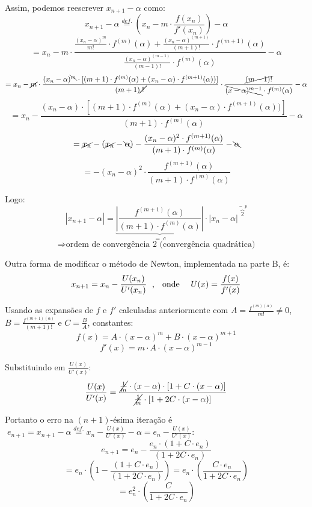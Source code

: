 \documentclass[12pt,a4paper,final]{article}
\begin{document}
Assim, podemos reescrever $ x_{n+1} - \alpha $ como:
\[ x_{n+1} - \alpha \overset{def.}{=} (x_n - m \cdot \frac{f(x_n)}{f'(x_n)}) - \alpha\]
\[ = x_n - m \cdot 
     \frac{\frac{(x_n - \alpha)^m}{m!} \cdot f^{(m)}(\alpha) + 
            \frac{(x_n - \alpha)^{(m+1)}}{(m+1)!} \cdot f^{(m+1)}(\alpha)}
          {\frac{(x_n - \alpha)^{(m-1)}}{(m-1)!} \cdot f^{(m)}(\alpha)} - \alpha\]
\[ = x_n - \cancel{m} \cdot \frac{(x_n - \alpha)^{\bcancel{m}} \cdot 
     [(m+1) \cdot f^{(m)}(\alpha) + (x_n - \alpha) \cdot f^{(m+1)}(\alpha))]}
     {(m+1)\cancel{\; ! \;}} \cdot \frac{\cancel{(m-1)!}}{\bcancel{(x - \alpha)^{m-1}} 
     \cdot f^{(m)}(\alpha)} - \alpha\]
\[ = x_n - \frac{(x_n - \alpha) \cdot [(m+1) \cdot f^{(m)}(\alpha) + (x_n - \alpha) 
     \cdot f^{(m+1)}(\alpha))]}{(m+1) \cdot f^{(m)}(\alpha)} - \alpha\]
\[ = \cancel{x_n} - (\cancel{x_n} - \bcancel{\alpha}) - \frac{(x_n - \alpha)^2 \cdot f^{(m+1)}(\alpha)}
     {(m+1) \cdot f^{(m)}(\alpha)} - \bcancel{\alpha}\]
\[ = - (x_n - \alpha)^2 \cdot \frac{f^{(m+1)}(\alpha)}{(m+1) \cdot f^{(m)}(\alpha)}\]

Logo:
\[ | x_{n+1} - \alpha | =  \underbrace{|\frac{f^{(m+1)}(\alpha)}{(m+1) \cdot f^{(m)}(\alpha)}|
                           }_{= \; c} \cdot |x_n - \alpha|^{\overbrace{2}^{= \; p}} \]
\[ \Rightarrow \text{ordem de convergência 2 (convergência quadrática)} \]

Outra forma de modificar o método de Newton, implementada na parte B, é:
\[ x_{n+1} = x_n - \frac{U(x_n)}{U'(x_n)} \text{\; , \; onde \quad} U(x) = \frac{f(x)}{f'(x)} \]

Usando as expansões de $ f $ e $ f' $ calculadas anteriormente com $ A = \frac{f^{(m)(\alpha)}}{m!} \neq 0 $, 
$ B = \frac{f^{(m+1)(\alpha)}}{(m+1)!} $ e $ C = \frac{B}{A} $, constantes:
\[ f(x) = A \cdot (x - \alpha)^m + B \cdot (x - \alpha)^{m+1} \]
\[ f'(x) = m \cdot A \cdot (x - \alpha)^{m-1} \]

Substituindo em $ \frac{U(x)}{U'(x)} $:
\[ \frac{U(x)}{U'(x)} = \frac
   {\cancel{\frac{1}{m}} \cdot (x-\alpha) \cdot [1 + C \cdot (x-\alpha)]}
   {\cancel{\frac{1}{m}} \cdot [1 + 2C \cdot (x-\alpha)]} \]

Portanto o erro na $(n+1)$-ésima iteração é $ \; e_{n+1} = x_{n+1} - \alpha \overset{def.}{=} x_n - \frac{U(x)}{U'(x)} - \alpha = e_n - \frac{U(x)}{U'(x)}$:
\[ e_{n+1} = e_n - \frac{e_n \cdot (1 + C \cdot e_n)}{(1 + 2C \cdot e_n)} \]
\[ = e_n \cdot ( 1 - \frac{(1 + C \cdot e_n)}{(1 + 2C \cdot e_n)} ) 
   = e_n \cdot (\frac{C \cdot e_n}{1 + 2C \cdot e_n})\]
\[ = e_n^2 \cdot (\frac{C}{1 + 2C \cdot e_n})\]
\end{document}
